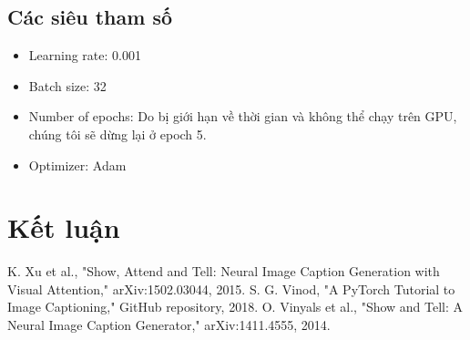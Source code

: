\documentclass[conference]{IEEEtran}
\begin{document}
\subsection{Các siêu tham số}

\begin{itemize}
    \item Learning rate: 0.001
    \item Batch size: 32
    \item Number of epochs: Do bị giới hạn về thời gian và không thể chạy trên GPU, chúng tôi sẽ dừng lại ở epoch 5.
    \item Optimizer: Adam
\end{itemize}

\section{Kết luận}

\begin{thebibliography}{00}
 K. Xu et al., "Show, Attend and Tell: Neural Image Caption Generation with Visual Attention," arXiv:1502.03044, 2015.
 S. G. Vinod, "A PyTorch Tutorial to Image Captioning," GitHub repository, 2018.
 O. Vinyals et al., "Show and Tell: A Neural Image Caption Generator," arXiv:1411.4555, 2014.
\end{thebibliography}
\vspace{12pt}
\color{red}
\end{document}
